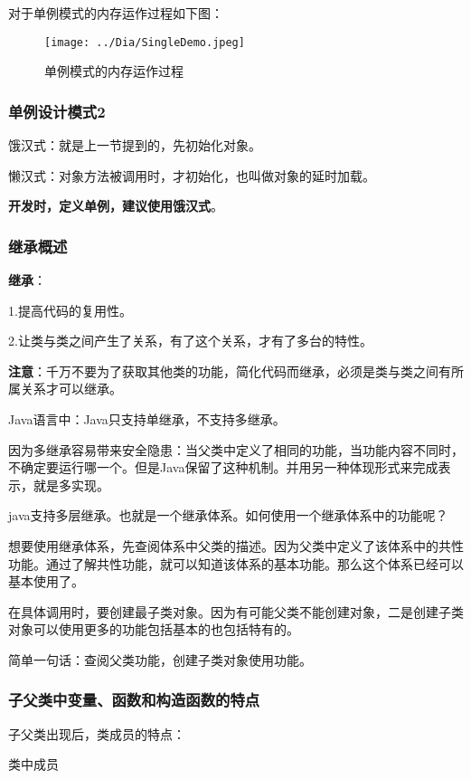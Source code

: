 \documentclass[UTF8]{ctexart}
\begin{document}
对于单例模式的内存运作过程如下图：
\begin{figure}[ht]
\centering
\texttt{[image: ../Dia/SingleDemo.jpeg]}
\caption{单例模式的内存运作过程}
\end{figure}

\subsubsection{单例设计模式2}

饿汉式：就是上一节提到的，先初始化对象。

懒汉式：对象方法被调用时，才初始化，也叫做对象的延时加载。

\textbf{开发时，定义单例，建议使用饿汉式}。

\subsubsection{继承概述}
\textbf{继承}：

1.提高代码的复用性。

2.让类与类之间产生了关系，有了这个关系，才有了多台的特性。

\textbf{注意}：千万不要为了获取其他类的功能，简化代码而继承，必须是类与类之间有所属关系才可以继承。

Java语言中：Java只支持单继承，不支持多继承。

因为多继承容易带来安全隐患：当父类中定义了相同的功能，当功能内容不同时，不确定要运行哪一个。但是Java保留了这种机制。并用另一种体现形式来完成表示，就是多实现。

java支持多层继承。也就是一个继承体系。如何使用一个继承体系中的功能呢？

想要使用继承体系，先查阅体系中父类的描述。因为父类中定义了该体系中的共性功能。通过了解共性功能，就可以知道该体系的基本功能。那么这个体系已经可以基本使用了。

在具体调用时，要创建最子类对象。因为有可能父类不能创建对象，二是创建子类对象可以使用更多的功能包括基本的也包括特有的。

简单一句话：查阅父类功能，创建子类对象使用功能。

\subsubsection{子父类中变量、函数和构造函数的特点}

子父类出现后，类成员的特点：

类中成员
\end{document}
